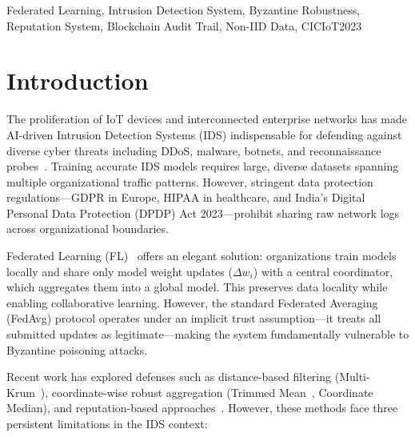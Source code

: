 \documentclass[conference]{IEEEtran}
\begin{document}
\begin{IEEEkeywords}
Federated Learning, Intrusion Detection System, Byzantine Robustness, Reputation System, Blockchain Audit Trail, Non-IID Data, CICIoT2023
\end{IEEEkeywords}

\section{Introduction}
\label{sec:introduction}

The proliferation of IoT devices and interconnected enterprise networks has made AI-driven Intrusion Detection Systems (IDS) indispensable for defending against diverse cyber threats including DDoS, malware, botnets, and reconnaissance probes~\cite{kang2020reputation}. Training accurate IDS models requires large, diverse datasets spanning multiple organizational traffic patterns. However, stringent data protection regulations---GDPR in Europe, HIPAA in healthcare, and India's Digital Personal Data Protection (DPDP) Act 2023---prohibit sharing raw network logs across organizational boundaries.

Federated Learning (FL)~\cite{mcmahan2017fedavg} offers an elegant solution: organizations train models locally and share only model weight updates ($\Delta w_i$) with a central coordinator, which aggregates them into a global model. This preserves data locality while enabling collaborative learning. However, the standard Federated Averaging (FedAvg) protocol operates under an implicit trust assumption---it treats all submitted updates as legitimate---making the system fundamentally vulnerable to Byzantine poisoning attacks.

Recent work has explored defenses such as distance-based filtering (Multi-Krum~\cite{blanchard2017krum}), coordinate-wise robust aggregation (Trimmed Mean~\cite{yin2018trimmedmean}, Coordinate Median), and reputation-based approaches~\cite{kang2020reputation, rashid2025tffl}. However, these methods face three persistent limitations in the IDS context:
\end{document}
